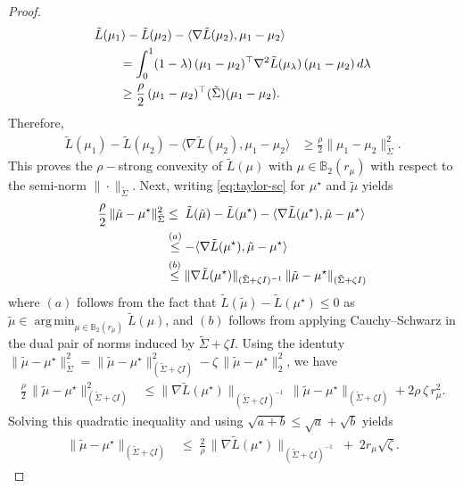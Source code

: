 \documentclass[10pt]{article} %
\DeclareMathOperator*{\argmin}{arg\,min}
\theoremstyle{plain}
\theoremstyle{definition}
\theoremstyle{remark}
\newcommand{\bB}{\mathbb{B}}
\begin{document}
\begin{proof}
\begin{align}
&\tilde L(\mu_1)-\tilde L(\mu_2)-\langle\nabla \tilde L(\mu_2),\mu_1-\mu_2\rangle \notag\\
&\qquad=\int_0^1(1-\lambda)\,(\mu_1-\mu_2)^\top\nabla^2 \tilde L(\mu_\lambda)\,(\mu_1-\mu_2)\,d\lambda \notag\\
&\qquad\ge \frac{\rho}{2}\,(\mu_1-\mu_2)^\top(\tilde\Sigma)(\mu_1-\mu_2). \label{eq:taylor-sc}
\end{align}
Therefore,
\begin{align}
\tilde L(\mu_1)-\tilde L(\mu_2)-\langle\nabla \tilde L(\mu_2),\mu_1-\mu_2\rangle
&\ge \frac{\rho}{2} \|\mu_1-\mu_2\|_{\tilde\Sigma}^2. 
\end{align}
This proves the $\rho-$strong convexity of $\tilde L(\mu)$ with $\mu\in\bB_2(r_\mu)$ with respect to the semi-norm $\|\cdot\|_{\tilde\Sigma}$. Next, writing \ref{eq:taylor-sc} for $\mu^\star$ and $\tilde\mu $ yields
\begin{align}
\frac{\rho}{2}\,\|\tilde\mu-\mu^\star\|_{\tilde\Sigma}^2
&\le\; \tilde L(\tilde\mu)-\tilde L(\mu^\star)-\langle\nabla\tilde L(\mu^\star),\tilde\mu-\mu^\star\rangle\notag\\
&\overset{(a)}{\le} -\langle\nabla\tilde L(\mu^\star),\tilde\mu-\mu^\star\rangle\notag\\
&\overset{(b)}{\le} \|\nabla\tilde L(\mu^\star)\|_{(\tilde\Sigma+\zeta I)^{-1}}\,
\|\tilde\mu-\mu^\star\|_{(\tilde\Sigma+\zeta I)}\label{eq:sc-mu-reg-norm}
\end{align}
where $(a)$ follows from the fact that $\tilde L(\tilde\mu)-\tilde L(\mu^\star)\le 0$ as $\tilde\mu\in\argmin_{\mu\in\bB_2(r_\mu)}\tilde L(\mu)$, and $(b)$ follows from applying Cauchy--Schwarz in the dual pair of norms induced by $\tilde\Sigma+\zeta I$. Using the identuty $\|\tilde\mu-\mu^\star\|_{\tilde\Sigma}^2
=\|\tilde\mu-\mu^\star\|_{(\tilde\Sigma+\zeta I)}^2
-\zeta \,\|\tilde\mu-\mu^\star\|_2^2$, we have
\begin{align}
\frac{\rho}{2}\,\|\tilde\mu-\mu^\star\|_{(\tilde\Sigma+\zeta I)}^2
&\le \|\nabla\tilde L(\mu^\star)\|_{(\tilde\Sigma+\zeta I)^{-1}}\, \|\tilde\mu-\mu^\star\|_{(\tilde\Sigma+\zeta I)}
+2\rho\,\zeta \,r_\mu^2.
\end{align}
Solving this quadratic inequality and using $\sqrt{a+b}\le \sqrt{a}+\sqrt{b}$ yields
\begin{align}
\|\tilde\mu-\mu^\star\|_{(\tilde\Sigma+\zeta I)} &\le \; \frac{2}{\rho}\, \|\nabla\tilde L(\mu^\star)\|_{(\tilde\Sigma+\zeta I)^{-1}} \;+\;2r_\mu\sqrt{\zeta }.
\label{eq:mu-opt-bound-grad-final}

\end{align}
\end{proof}
\end{document}

